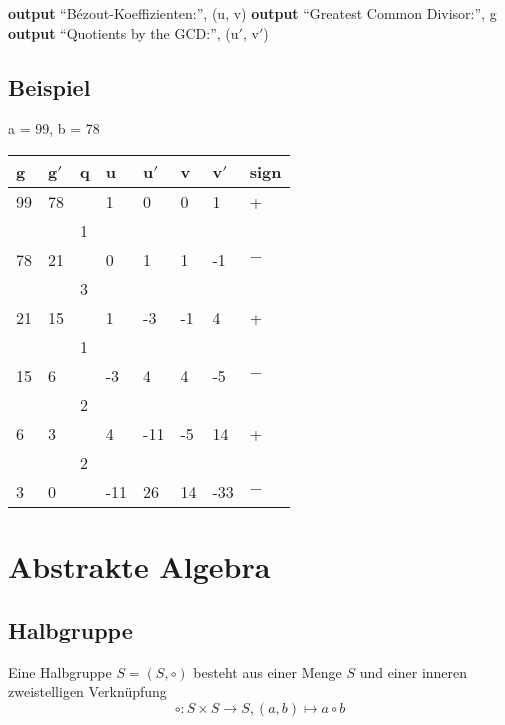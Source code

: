 \documentclass[a4paper, ngerman, landscape, fleqn]{article}
\begin{document}
\begin{multicols*}{3}
\begin{algorithmic}
        \State \textbf{output} ``Bézout-Koeffizienten:'', (u, v)
        \State \textbf{output} ``Greatest Common Divisor:'', g
        \State \textbf{output} ``Quotients by the GCD:'', (u$'$, v$'$)
    \EndFunction
\end{algorithmic}

\subsection*{Beispiel}
a = 99, b = 78
\vspace{1ex}

\begin{tabularx}{\linewidth}{XXXXXXXX}
    \hline
     g & g$'$ & q &   u & u$'$ &  v & v$'$ & sign \\
    \hline
    99 &   78 &   &   1 &    0 &  0 &    1 &    + \\
       &      & 1 &     &      &    &      &      \\
    78 &   21 &   &   0 &    1 &  1 &   -1 &   $-$\\
       &      & 3 &     &      &    &      &      \\
    21 &   15 &   &   1 &   -3 & -1 &    4 &    + \\
       &      & 1 &     &      &    &      &      \\
    15 &    6 &   &  -3 &    4 &  4 &   -5 &   $-$\\
       &      & 2 &     &      &    &      &      \\
     6 &    3 &   &   4 &  -11 & -5 &   14 &    + \\
       &      & 2 &     &      &    &      &      \\
     3 &    0 &   & -11 &   26 & 14 &  -33 &   $-$\\
    \hline
\end{tabularx}

\section*{Abstrakte Algebra}

\subsection*{Halbgruppe}
Eine Halbgruppe $S = (S, \circ)$ besteht aus einer Menge $S$ und einer inneren zweistelligen Verknüpfung 
\begin{equation*}
    \circ : S \times S \rightarrow S, (a, b) \mapsto a \circ b
\end{equation*}


\end{multicols*}
\end{document}
